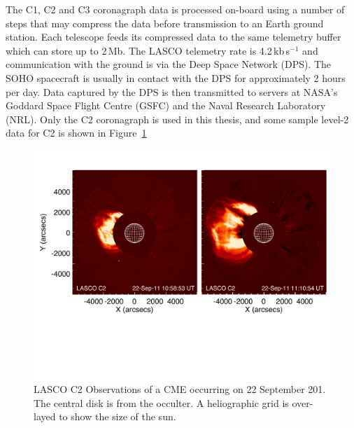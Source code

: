 The C1, C2 and C3 coronagraph data is processed on-board using a number of steps that may compress the data before transmission to an Earth ground station. Each telescope feeds its compressed data to the same telemetry buffer which can store up to 2\,Mb. The  LASCO telemetry rate is 4.2\,kb\,s$^{-1}$ and communication with the ground is via the Deep Space Network (DPS). The SOHO spacecraft is usually in contact with the DPS for approximately 2 hours per day. Data captured by the DPS is then transmitted to servers at NASA's Goddard Space Flight Centre (GSFC) and the Naval Research Laboratory (NRL). Only the C2 coronagraph is used in this thesis, and some sample level-2 data for C2 is shown in Figure~\ref{fig:lasco_c2_obs}
\begin{figure}[!t]
\begin{center}
\includegraphics[scale=0.55, trim=2cm 6cm 1cm 2cm]{images/lasco_c2_thesis.pdf}
\caption[LASCO C2 Observations]{LASCO C2 Observations of a CME occurring on 22 September 201. The central disk is from the occulter. A heliographic grid is over-layed to show the size of the sun.}
\label{fig:lasco_c2_obs}
\end{center}
\end{figure}


